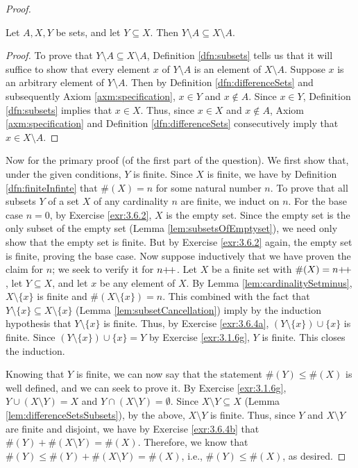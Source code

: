 \documentclass[../main.tex]{subfiles}
\begin{document}
\begin{enumerate}[ref={\thesection.\arabic*}]
\begin{prp}
\begin{enumerate}[label={\textup{(}\alph*\textup{)}},ref={\theenumi\alph*}]
\begin{proof}
\begin{lem}
                \end{lem}
                \begin{lem}\label{lem:subsetCancellation}
                    Let $A,X,Y$ be sets, and let $Y\subseteq X$. Then $Y\setminus A\subseteq X\setminus A$.
                    \begin{proof}
                        To prove that $Y\setminus A\subseteq X\setminus A$, Definition \ref{dfn:subsets} tells us that it will suffice to show that every element $x$ of $Y\setminus A$ is an element of $X\setminus A$. Suppose $x$ is an arbitrary element of $Y\setminus A$. Then by Definition \ref{dfn:differenceSets} and subsequently Axiom \ref{axm:specification}, $x\in Y$ and $x\notin A$. Since $x\in Y$, Definition \ref{dfn:subsets} implies that $x\in X$. Thus, since $x\in X$ and $x\notin A$, Axiom \ref{axm:specification} and Definition \ref{dfn:differenceSets} consecutively imply that $x\in X\setminus A$.
                    \end{proof}
                \end{lem}
                Now for the primary proof (of the first part of the question). We first show that, under the given conditions, $Y$ is finite. Since $X$ is finite, we have by Definition \ref{dfn:finiteInfinte} that $\#(X)=n$ for some natural number $n$. To prove that all subsets $Y$ of a set $X$ of any cardinality $n$ are finite, we induct on $n$. For the base case $n=0$, by Exercise \ref{exr:3.6.2}, $X$ is the empty set. Since the empty set is the only subset of the empty set (Lemma \ref{lem:subsetsOfEmptyset}), we need only show that the empty set is finite. But by Exercise \ref{exr:3.6.2} again, the empty set is finite, proving the base case. Now suppose inductively that we have proven the claim for $n$; we seek to verify it for $n{+\!+}$. Let $X$ be a finite set with $\#(X)=n{+\!+}$, let $Y\subseteq X$, and let $x$ be any element of $X$. By Lemma \ref{lem:cardinalitySetminus}, $X\setminus\{x\}$ is finite and $\#(X\setminus\{x\})=n$. This combined with the fact that $Y\setminus\{x\}\subseteq X\setminus\{x\}$ (Lemma \ref{lem:subsetCancellation}) imply by the induction hypothesis that $Y\setminus\{x\}$ is finite. Thus, by Exercise \ref{exr:3.6.4a}, $(Y\setminus\{x\})\cup\{x\}$ is finite. Since $(Y\setminus\{x\})\cup\{x\}=Y$ by Exercise \ref{exr:3.1.6g}, $Y$ is finite. This closes the induction.\par
                Knowing that $Y$ is finite, we can now say that the statement $\#(Y)\leq\#(X)$ is well defined, and we can seek to prove it. By Exercise \ref{exr:3.1.6g}, $Y\cup(X\setminus Y)=X$ and $Y\cap(X\setminus Y)=\emptyset$. Since $X\setminus Y\subseteq X$ (Lemma \ref{lem:differenceSetsSubsets}), by the above, $X\setminus Y$ is finite. Thus, since $Y$ and $X\setminus Y$ are finite and disjoint, we have by Exercise \ref{exr:3.6.4b} that $\#(Y)+\#(X\setminus Y)=\#(X)$. Therefore, we know that $\#(Y)\leq\#(Y)+\#(X\setminus Y)=\#(X)$, i.e., $\#(Y)\leq\#(X)$, as desired.\par

\end{proof}
\end{enumerate}
\end{prp}
\end{enumerate}
\end{document}
